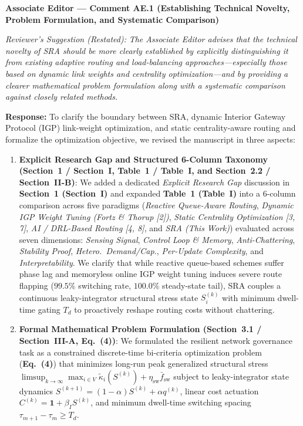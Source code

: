 \documentclass[11pt,a4paper]{article}
\newcommand{\cbox}[2]{%
  \vspace{0.6em}\noindent\textbf{#1}\par\smallskip
  \noindent\textit{Reviewer's Suggestion (Restated):} \textit{#2}\par\smallskip
}
\begin{document}
\cbox{Associate Editor --- Comment AE.1 (Establishing Technical Novelty, Problem Formulation, and Systematic Comparison)}{The Associate Editor advises that the technical novelty of SRA should be more clearly established by explicitly distinguishing it from existing adaptive routing and load-balancing approaches---especially those based on dynamic link weights and centrality optimization---and by providing a clearer mathematical problem formulation along with a systematic comparison against closely related methods.}

\noindent\textbf{Response:} To clarify the boundary between SRA, dynamic Interior Gateway Protocol (IGP) link-weight optimization, and static centrality-aware routing and formalize the optimization objective, we revised the manuscript in three aspects:
\begin{enumerate}[leftmargin=1.8em]
    \item \textbf{Explicit Research Gap and Structured 6-Column Taxonomy (Section~1 / Section~I, Table~1 / Table~I, and Section~2.2 / Section~II-B)}: We added a dedicated \textit{Explicit Research Gap} discussion in \textbf{Section~1 (Section~I)} and expanded \textbf{Table~1 (Table~I)} into a 6-column comparison across five paradigms (\textit{Reactive Queue-Aware Routing}, \textit{Dynamic IGP Weight Tuning (Fortz \& Thorup [2])}, \textit{Static Centrality Optimization [3, 7]}, \textit{AI / DRL-Based Routing [4, 8]}, and \textit{SRA (This Work)}) evaluated across seven dimensions: \textit{Sensing Signal}, \textit{Control Loop \& Memory}, \textit{Anti-Chattering}, \textit{Stability Proof}, \textit{Hetero.\ Demand/Cap.}, \textit{Per-Update Complexity}, and \textit{Interpretability}. We clarify that while reactive queue-based schemes suffer phase lag and memoryless online IGP weight tuning induces severe route flapping ($99.5\%$ switching rate, $100.0\%$ steady-state tail), SRA couples a continuous leaky-integrator structural stress state $S_i^{(k)}$ with minimum dwell-time gating $T_d$ to proactively reshape routing costs without chattering.
    \item \textbf{Formal Mathematical Problem Formulation (Section~3.1 / Section~III-A, Eq.~(4))}: We formulated the resilient network governance task as a constrained discrete-time bi-criteria optimization problem (\textbf{Eq.~(4)}) that minimizes long-run peak generalized structural stress $\limsup_{k\to\infty}\max_{i\in V}\widetilde{\kappa}_i(S^{(k)}) + \eta_{\text{sw}}\bar{f}_{\text{sw}}$ subject to leaky-integrator state dynamics $S^{(k+1)}=(1-\alpha)S^{(k)}+\alpha q^{(k)}$, linear cost actuation $C^{(k)}=\mathbf{1}+\beta_I S^{(k)}$, and minimum dwell-time switching spacing $\tau_{m+1}-\tau_m \ge T_d$.

\end{enumerate}
\end{document}
